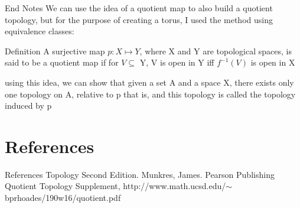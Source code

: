 \documentclass[aspectratio=169,xcolor=dvipsnames]{beamer}
\begin{document}
\begin{frame}{End Notes}
We can use the idea of a quotient map to also build a quotient topology, but for the purpose of creating a torus, I used the method using equivalence classes:
\begin{block}{Definition}
       A surjective map $p:X \mapsto Y$, where X and Y are topological spaces, is said to be a quotient map if for $V \subseteq$ Y, V is open in Y iff $f^{-1}(V)$ is open in X
    \end{block} 
    using this idea, we can show that given a set A and a space X, there exists only one topology on A, relative to p that is, and this topology is called the topology induced by p
\end{frame}
\section{References}
\begin{frame}{References}
    Topology Second Edition. Munkres, James. Pearson Publishing
    \newline
    \newline
    Quotient Topology Supplement, http://www.math.ucsd.edu/$\sim$bprhoades/190w16/quotient.pdf
\end{frame}
\end{document}
